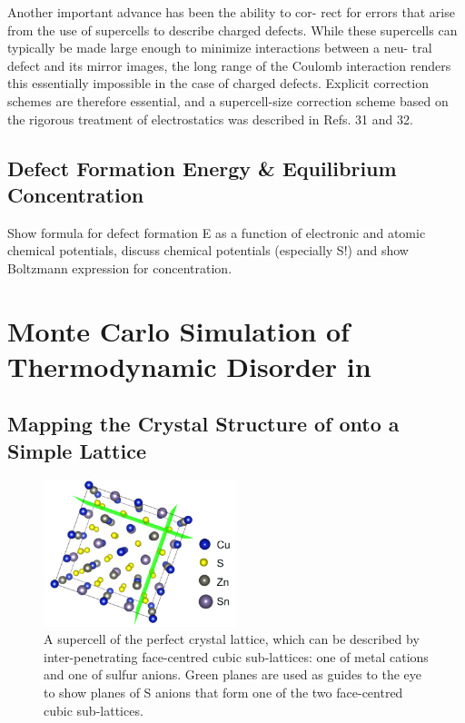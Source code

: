 Another important advance has been the ability to cor-
rect for errors that arise from the use of supercells to describe charged defects. While these supercells can typically be made large enough to minimize interactions between a neu- tral defect and its mirror images, the long range of the Coulomb interaction renders this essentially impossible in the case of charged defects. Explicit correction schemes are therefore essential, and a supercell-size correction scheme based on the rigorous treatment of electrostatics was described in Refs. 31 and 32. \cite{defects_tutorial}


\subsection{Defect Formation Energy \& Equilibrium Concentration}\label{defect_section}
Show formula for defect formation E as a function of electronic and atomic chemical potentials, discuss chemical potentials (especially S!) and show Boltzmann expression for concentration.



\section{Monte Carlo Simulation of Thermodynamic Disorder in \CZTS}\label{MC_section}

\subsection{Mapping the Crystal Structure of { \CZTS } onto a Simple Lattice}

\begin{figure}[h!]
  \centering
    \includegraphics[width=0.5\textwidth]{figures/CZTS_lattice_mapping.png}
    \caption{A supercell of the perfect{ \CZTS } crystal lattice, which can be described by inter-penetrating face-centred cubic sub-lattices: one of metal cations and one of sulfur anions. Green planes are used as guides to the eye to show planes of S anions that form one of the two face-centred cubic sub-lattices.}
  \label{CZTS_lattice_mapping}
\end{figure}

